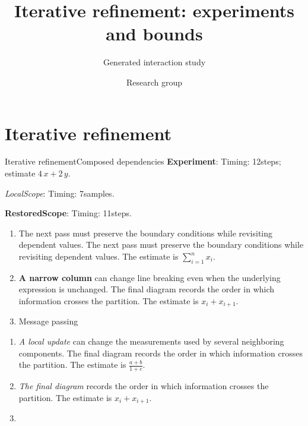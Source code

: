 \documentclass[12pt,aspectratio=169]{beamer}
\title{Iterative refinement: experiments and bounds}
\subtitle{Generated interaction study}
\author{Research group}
\date{}
\newcommand{\fuzzlayerA}[1]{\textbf{#1}}
\newcommand{\fuzzterm}[1]{\fuzzlayerA{#1}}
\newcommand{\fuzzpair}[2]{\fuzzterm{#1}: #2}
\newcommand{\fuzzunit}{steps}
\newcommand{\fuzzcoefficient}{4}
\newcommand{\fuzzscale}[2][\fuzzcoefficient]{#1\,#2}
\begin{document}
\section{Iterative refinement}
\begin{frame}[t,shrink=5]{Iterative refinement}{Composed dependencies}
\fuzzpair{Experiment}{Timing: 12\fuzzunit; estimate $\fuzzscale{x}+\fuzzscale[2]{y}$.}\par
{\renewcommand{\fuzzunit}{samples}\let\fuzzterm\textit\fuzzpair{LocalScope}{Timing: 7\fuzzunit.}\par}
\fuzzpair{RestoredScope}{Timing: 11\fuzzunit.}\par
{\small\color{blue}\raggedright
\begin{enumerate}
\item \textrm{The next pass} must preserve the boundary conditions while revisiting dependent values. The next pass must preserve the boundary conditions while revisiting dependent values. The estimate is $\sum_{i=1}^{n}x_i$.
\item \textbf{A narrow column} can change line breaking even when the underlying expression is unchanged. The final diagram records the order in which information crosses the partition. The estimate is $x_i+x_{i+1}$.
\item \begin{alertblock}{Message passing}
\end{alertblock}
\end{enumerate}
\par
{\footnotesize\color{teal}\raggedright
\begin{enumerate}
\item \textit{A local update} can change the measurements used by several neighboring components. The final diagram records the order in which information crosses the partition. The estimate is $\frac{a+b}{1+c}$.
\item \textit{The final diagram} records the order in which information crosses the partition.  The estimate is $x_i+x_{i+1}$.
\item {}
\end{enumerate}}}
\end{frame}
\end{document}
